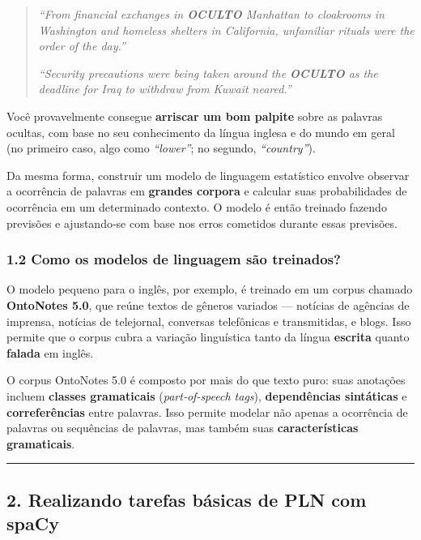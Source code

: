 \documentclass[
  brazilian,
  11pt,
]{article}
\begin{document}
\begin{quote}
\emph{``From financial exchanges in \textbf{OCULTO} Manhattan to
cloakrooms in Washington and homeless shelters in California, unfamiliar
rituals were the order of the day.''}

\emph{``Security precautions were being taken around the \textbf{OCULTO}
as the deadline for Iraq to withdraw from Kuwait neared.''}
\end{quote}

Você provavelmente consegue \textbf{arriscar um bom palpite} sobre as
palavras ocultas, com base no seu conhecimento da língua inglesa e do
mundo em geral (no primeiro caso, algo como \emph{``lower''}; no
segundo, \emph{``country''}).

Da mesma forma, construir um modelo de linguagem estatístico envolve
observar a ocorrência de palavras em \textbf{grandes corpora} e calcular
suas probabilidades de ocorrência em um determinado contexto. O modelo é
então treinado fazendo previsões e ajustando‑se com base nos erros
cometidos durante essas previsões.

\subsubsection{1.2 Como os modelos de linguagem são
treinados?}\label{como-os-modelos-de-linguagem-suxe3o-treinados}

O modelo pequeno para o inglês, por exemplo, é treinado em um corpus
chamado \textbf{OntoNotes 5.0}, que reúne textos de gêneros variados ---
notícias de agências de imprensa, notícias de telejornal, conversas
telefônicas e transmitidas, e blogs. Isso permite que o corpus cubra a
variação linguística tanto da língua \textbf{escrita} quanto
\textbf{falada} em inglês.

O corpus OntoNotes 5.0 é composto por mais do que texto puro: suas
anotações incluem \textbf{classes gramaticais} (\emph{part‑of‑speech
tags}), \textbf{dependências sintáticas} e \textbf{correferências} entre
palavras. Isso permite modelar não apenas a ocorrência de palavras ou
sequências de palavras, mas também suas \textbf{características
gramaticais}.

\begin{center}\rule{0.5\linewidth}{0.5pt}\end{center}

\subsection{2. Realizando tarefas básicas de PLN com
spaCy}\label{realizando-tarefas-buxe1sicas-de-pln-com-spacy}
\end{document}
